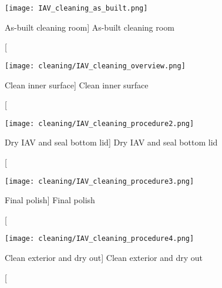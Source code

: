 \begin{figure}
    \centering
    \texttt{[image: IAV\_cleaning\_as\_built.png]}
    \caption
    [As-built cleaning room]
    {As-built cleaning room}
    \label{fig:IAV_cleaning_as_built.png}
    \end{figure}

\begin{figure}
    \centering
    \texttt{[image: cleaning/IAV\_cleaning\_overview.png]}
    \caption
    [Clean inner surface]
    {Clean inner surface}
    \label{fig:IAV_cleaning_overview.png}
    \end{figure}

\begin{figure}
    \centering
    \texttt{[image: cleaning/IAV\_cleaning\_procedure2.png]}
    \caption
    [Dry IAV and seal bottom lid]
    {Dry IAV and seal bottom lid}
    \label{fig:IAV_cleaning_procedure2.png}
    \end{figure}

\begin{figure}
    \centering
    \texttt{[image: cleaning/IAV\_cleaning\_procedure3.png]}
    \caption
    [Final polish]
    {Final polish}
    \label{fig:IAV_cleaning_procedure3.png}
    \end{figure}

\begin{figure}
    \centering
    \texttt{[image: cleaning/IAV\_cleaning\_procedure4.png]}
    \caption
    [Clean exterior and dry out]
    {Clean exterior and dry out}
    \label{fig:IAV_cleaning_procedure4.png}
    \end{figure}


%
%
%
%
%
%
%
%
%
%
%
%
%
%
%
%
%

